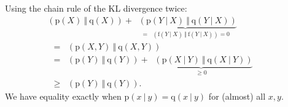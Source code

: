 \documentclass[25pt,a0paper,landscape]{tikzposter}
\DeclareMathOperator{\opExpectation}{\mathbb{E}}
\newcommand{\E}[2]{\opExpectation_{#1} \left [ #2 \right ]}
\newcommand{\MidSymbol}[1][]{\:#1\:}
\newcommand{\given}{\MidSymbol[\vert]}
\DeclareMathOperator{\opEntropy}{H}
\newcommand{\xHof}[1]{\opEntropy(#1)}
\DeclareMathOperator{\opKale}{D_\mathrm{KL}}
\newcommand{\Kale}[2]{\opKale(#1 \MidSymbol[\Vert] #2)}
\newcommand{\opp}{\mathrm{p}}
\newcommand{\pof}[1]{\opp(#1)}
\newcommand{\opq}{\mathrm{q}}
\newcommand{\qof}[1]{\opq(#1)}
\newcommand{\w}{\boldsymbol{\theta}}
\newcommand{\W}{\boldsymbol{\Theta}}
\newcommand{\Dany}{\mathcal{D}}
\begin{document}
\begin{columns}
{\begin{multicols}{2}
\begin{proofbox}[title={Proof of the DPI}]
    Using the chain rule of the KL divergence twice:
    \begin{align*}
    &\mathop{\mathrm{D_\mathrm{KL}}}(\mathrm{p}(X) \:\Vert\: \mathrm{q}(X)) + \underbrace{\mathop{\mathrm{D_\mathrm{KL}}}(\mathrm{p}(Y\:\vert\:X) \:\Vert\: \mathrm{q}(Y \:\vert\:X))}_{=\mathop{\mathrm{D_\mathrm{KL}}}(\mathrm{f}(Y\:\vert\:X) \:\Vert\: \mathrm{f}(Y \:\vert\:X))=0}\\
    &\quad =\mathop{\mathrm{D_\mathrm{KL}}}(\mathrm{p}(X, Y) \:\Vert\: \mathrm{q}(X, Y))\\
    &\quad =\mathop{\mathrm{D_\mathrm{KL}}}(\mathrm{p}(Y) \:\Vert\: \mathrm{q}(Y))+\underbrace{\mathop{\mathrm{D_\mathrm{KL}}}(\mathrm{p}(X \:\vert\:Y) \:\Vert\: \mathrm{q}(X \:\vert\:Y))}_{\ge 0}\\
    &\quad \ge \mathop{\mathrm{D_\mathrm{KL}}}(\mathrm{p}(Y) \:\Vert\: \mathrm{q}(Y)).
    \end{align*}
    We have equality exactly when $\mathrm{p}(x \:\vert\:y) = \mathrm{q}(x \:\vert\:y)$ for (almost) all $x, y.$
    \end{proofbox}
  \end{multicols}
}

\end{columns}
\end{document}
